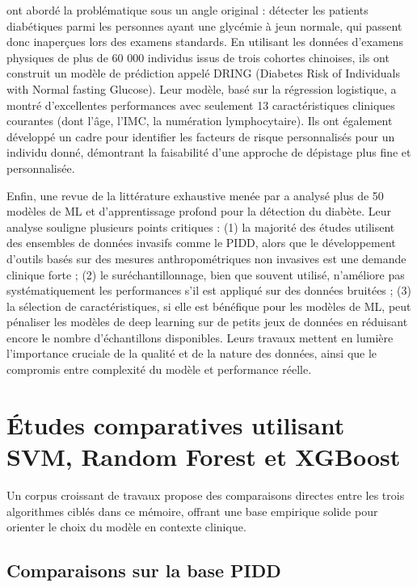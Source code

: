 \cite{lv2023detection} ont abordé la problématique sous un angle original : détecter les patients diabétiques parmi les personnes ayant une glycémie à jeun normale, qui passent donc inaperçues lors des examens standards. En utilisant les données d'examens physiques de plus de 60 000 individus issus de trois cohortes chinoises, ils ont construit un modèle de prédiction appelé DRING (Diabetes Risk of Individuals with Normal fasting Glucose). Leur modèle, basé sur la régression logistique, a montré d'excellentes performances avec seulement 13 caractéristiques cliniques courantes (dont l'âge, l'IMC, la numération lymphocytaire). Ils ont également développé un cadre pour identifier les facteurs de risque personnalisés pour un individu donné, démontrant la faisabilité d'une approche de dépistage plus fine et personnalisée.

Enfin, une revue de la littérature exhaustive menée par \cite{juwono2024machine} a analysé plus de 50 modèles de ML et d'apprentissage profond pour la détection du diabète. Leur analyse souligne plusieurs points critiques : (1) la majorité des études utilisent des ensembles de données invasifs comme le PIDD, alors que le développement d'outils basés sur des mesures anthropométriques non invasives est une demande clinique forte ; (2) le suréchantillonnage, bien que souvent utilisé, n'améliore pas systématiquement les performances s'il est appliqué sur des données bruitées ; (3) la sélection de caractéristiques, si elle est bénéfique pour les modèles de ML, peut pénaliser les modèles de deep learning sur de petits jeux de données en réduisant encore le nombre d'échantillons disponibles. Leurs travaux mettent en lumière l'importance cruciale de la qualité et de la nature des données, ainsi que le compromis entre complexité du modèle et performance réelle.


\section{Études comparatives utilisant SVM, Random Forest et XGBoost}

Un corpus croissant de travaux propose des comparaisons directes entre les trois algorithmes
ciblés dans ce mémoire, offrant une base empirique solide pour orienter le choix du modèle
en contexte clinique.

\subsection{Comparaisons sur la base PIDD}

